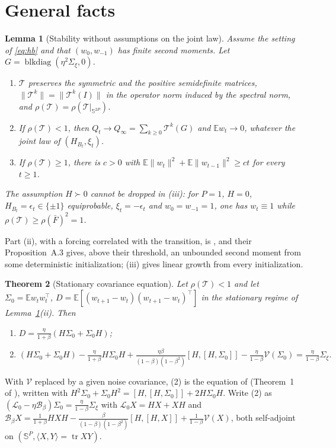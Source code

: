 \documentclass[11pt]{article}
\newtheorem{theorem}{Theorem}
\newtheorem{lemma}[theorem]{Lemma}
\theoremstyle{remark}
\newcommand{\E}{\mathbb{E}}
\newcommand{\tr}{\operatorname{tr}}
\newcommand{\T}{\mathcal T}
\newcommand{\V}{\mathcal V}
\begin{document}
\section{General facts}\label{sec:general}

\begin{lemma}[Stability without assumptions on the joint law]\label{lem:stab}
Assume the setting of \eqref{eq:hb} and that $(w_0,w_{-1})$ has finite second moments. Let $G=\operatorname{blkdiag}(\eta^2\Sigma_\xi,0)$.
\begin{enumerate}
\item[(i)] $\T$ preserves the symmetric and the positive semidefinite matrices, $\|\T^k\|=\|\T^k(I)\|$ in the operator norm induced by the spectral norm, and $\rho(\T)=\rho(\T|_{\mathbb S^{2P}})$.
\item[(ii)] If $\rho(\T)<1$, then $Q_t\to Q_\infty=\sum_{k\ge0}\T^k(G)$ and $\E w_t\to0$, whatever the joint law of $(H_{B_t},\xi_t)$.
\item[(iii)] If $\rho(\T)\ge1$, there is $c>0$ with $\E\|w_t\|^2+\E\|w_{t-1}\|^2\ge ct$ for every $t\ge1$.
\end{enumerate}
The assumption $H\succ0$ cannot be dropped in (iii): for $P=1$, $H=0$, $H_{B_t}=\epsilon_t\in\{\pm1\}$ equiprobable, $\xi_t=-\epsilon_t$ and $w_0=w_{-1}=1$, one has $w_t\equiv1$ while $\rho(\T)\ge\rho(\bar F)^2=1$.
\end{lemma}
Part (ii), with a forcing correlated with the transition, is \citet[Proposition~C.3]{cai2026llm}, and their Proposition~A.3 gives, above their threshold, an unbounded second moment from some deterministic initialization; (iii) gives linear growth from every initialization.

\begin{theorem}[Stationary covariance equation]\label{thm:lyap}
Let $\rho(\T)<1$ and let $\Sigma_0=\E w_tw_t^\top$, $D=\E[(w_{t+1}-w_t)(w_{t+1}-w_t)^\top]$ in the stationary regime of Lemma~\ref{lem:stab}(ii). Then
\begin{enumerate}
\item[(1)] $D=\frac{\eta}{1+\beta}(H\Sigma_0+\Sigma_0H)$;
\item[(2)] $\displaystyle(H\Sigma_0+\Sigma_0H)-\frac{\eta}{1+\beta}H\Sigma_0H+\frac{\eta\beta}{(1-\beta)(1-\beta^2)}[H,[H,\Sigma_0]]-\frac{\eta}{1-\beta}\V(\Sigma_0)=\frac{\eta}{1-\beta}\Sigma_\xi.$
\end{enumerate}
\end{theorem}
With $\V$ replaced by a given noise covariance, (2) is the equation of \citet{liu2021noise} (Theorem~1 of \citet{ziyin2022strength}), written with $H^2\Sigma_0+\Sigma_0H^2=[H,[H,\Sigma_0]]+2H\Sigma_0H$. Write (2) as $(\mathcal L_0-\eta\mathcal B_\beta)\Sigma_0=\frac{\eta}{1-\beta}\Sigma_\xi$ with $\mathcal L_0X=HX+XH$ and $\mathcal B_\beta X=\frac{1}{1+\beta}HXH-\frac{\beta}{(1-\beta)(1-\beta^2)}[H,[H,X]]+\frac1{1-\beta}\V(X)$, both self-adjoint on $(\mathbb S^P,\langle X,Y\rangle=\tr XY)$.
\end{document}
